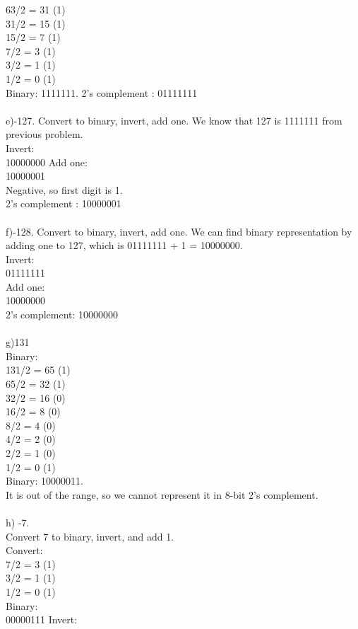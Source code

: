 \documentclass[a4paper]{article}
\begin{document}
63/2 = 31 (1)\\
31/2 = 15 (1)\\
15/2 = 7 (1) \\
7/2 = 3 (1) \\
3/2 = 1 (1) \\
1/2 = 0 (1)\\
Binary: 1111111. 2's complement : 01111111 \\\\
e)-127. Convert to binary, invert, add one. We know that 127 is 1111111 from previous problem.\\
Invert:\\
10000000
Add one:\\
10000001\\
Negative, so first digit is 1. 
\\ 2's complement : 10000001\\\\
f)-128. Convert to binary, invert, add one.
We can find binary representation by adding one to 127, which is 01111111 + 1 = 10000000. \\
Invert: \\
01111111\\
Add one:\\
10000000\\
2's complement: 10000000\\\\
g)131\\
Binary:\\
131/2 = 65 (1)\\
65/2 = 32 (1)\\
32/2 = 16 (0)\\
16/2 = 8 (0)\\
8/2 = 4 (0)\\
4/2 = 2 (0)\\
2/2 = 1 (0)\\
1/2 = 0 (1)\\
Binary: 10000011. \\
It is out of the range, so we cannot represent it in 8-bit 2's complement.\\\\
h) -7. \\
Convert 7 to binary, invert, and add 1.\\
Convert:\\
7/2 = 3 (1)\\
3/2 = 1 (1)\\
1/2 = 0 (1)\\
Binary:\\
00000111
Invert:\\
\end{document}

